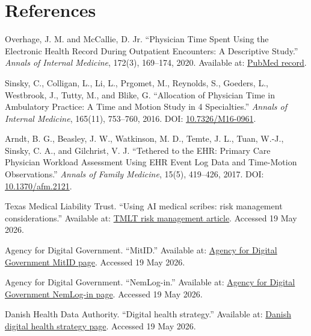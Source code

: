 \section*{References}
{}

\begin{enumerate}[label={\textbf{[\arabic*]}},leftmargin=2.4em]
  \item \hypertarget{ref:1}{}Overhage, J. M. and McCallie, D. Jr. ``Physician Time Spent Using the Electronic Health Record During Outpatient Encounters: A Descriptive Study.'' \textit{Annals of Internal Medicine}, 172(3), 169--174, 2020. Available at: \href{https://pubmed.ncbi.nlm.nih.gov/31931523/}{PubMed record}.
  \item \hypertarget{ref:2}{}Sinsky, C., Colligan, L., Li, L., Prgomet, M., Reynolds, S., Goeders, L., Westbrook, J., Tutty, M., and Blike, G. ``Allocation of Physician Time in Ambulatory Practice: A Time and Motion Study in 4 Specialties.'' \textit{Annals of Internal Medicine}, 165(11), 753--760, 2016. DOI: \href{https://doi.org/10.7326/M16-0961}{10.7326/M16-0961}.
  \item \hypertarget{ref:3}{}Arndt, B. G., Beasley, J. W., Watkinson, M. D., Temte, J. L., Tuan, W.-J., Sinsky, C. A., and Gilchrist, V. J. ``Tethered to the EHR: Primary Care Physician Workload Assessment Using EHR Event Log Data and Time-Motion Observations.'' \textit{Annals of Family Medicine}, 15(5), 419--426, 2017. DOI: \href{https://doi.org/10.1370/afm.2121}{10.1370/afm.2121}.
  \item \hypertarget{ref:4}{}Texas Medical Liability Trust. ``Using AI medical scribes: risk management considerations.'' Available at: \href{https://www.tmlt.org/resource/using-ai-medical-scribes-risk-management-considerations}{TMLT risk management article}. Accessed 19 May 2026.
  \item \hypertarget{ref:5}{}Agency for Digital Government. ``MitID.'' Available at: \href{https://en.digst.dk/systems/mitid/}{Agency for Digital Government MitID page}. Accessed 19 May 2026.
  \item \hypertarget{ref:6}{}Agency for Digital Government. ``NemLog-in.'' Available at: \href{https://en.digst.dk/systems/nemlog-in/}{Agency for Digital Government NemLog-in page}. Accessed 19 May 2026.
  \item \hypertarget{ref:7}{}Danish Health Data Authority. ``Digital health strategy.'' Available at: \href{https://english.sundhedsdatastyrelsen.dk/digital-health-solutions/digital-health-strategy}{Danish digital health strategy page}. Accessed 19 May 2026.

\end{enumerate}
